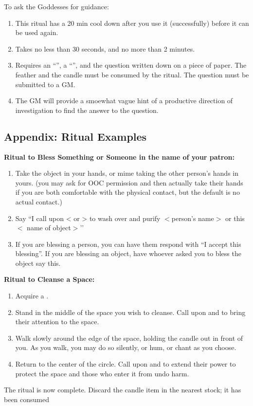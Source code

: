 \documentclass[green]{GL2020}
\begin{document}
To ask the Goddesses for guidance:
\begin{enumerate}
    \item This ritual has a 20 min cool down after you use it (successfully) before it can be used again.
    \item Takes no less than 30 seconds, and no more than 2 minutes.
    \item Requires an ``\iEagleFeather{}'', a ``\iRitualCandle{}'', and the question written down on a piece of paper. The feather and the candle must be consumed by the ritual. The question must be submitted to a GM.
		\item The GM will provide a smoewhat vague hint of a productive direction of investigation to find the answer to the question.
  \end{enumerate}

\subsection*{Appendix: Ritual Examples}

\textbf{Ritual to Bless Something or Someone in the name of your patron:}
  \begin{enumerate}
    \item Take the object in your hands, or mime taking the other person’s hands in yours. (you may ask for OOC permission and then actually take their hands if you are both comfortable with the physical contact, but the default is no actual contact.)
    \item Say ``I call upon <\cEbb{} or \cFlow{}> to wash over and purify  $<$person’s name$>$ or this $<$ name of object$>$’’
    \item If you are blessing a person, you can have them respond with ``I accept this blessing''. If you are blessing an object, have whoever asked you to bless the object say this.
  \end{enumerate}

\textbf{Ritual to Cleanse a Space:}
  \begin{enumerate}
    \item Acquire a \iRitualCandle{}.
    \item Stand in the middle of the space you wish to cleanse. Call upon \cEbb{} and \cFlow{} to bring their attention to the space.
    \item Walk slowly around the edge of the space, holding the candle out in front of you. As you walk, you may do so silently, or hum, or chant as you choose.
    \item Return to the center of the circle. Call upon \cEbb{} and \cFlow{} to extend their power to protect the space and those who enter it from undo harm.
  \end{enumerate}
The ritual is now complete. Discard the candle item in the nearest stock; it has been consumed
   
\end{document}

